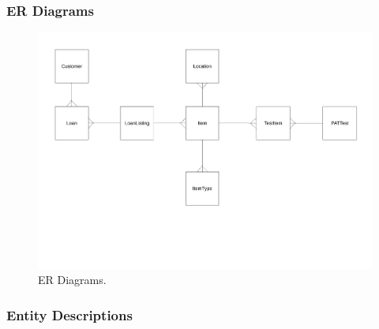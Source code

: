\begin{landscape}

\subsubsection{ER Diagrams}

\begin{figure}[H]
    \centerline{\includegraphics[width=600px]{./Design/Database_Design/Normalisation/ER_Diagrams/ER_Diagram.pdf}}
    \caption{ER Diagrams.} \label{fig:ER Diagrams}
\end{figure}

\end{landscape}

\subsubsection{Entity Descriptions}

